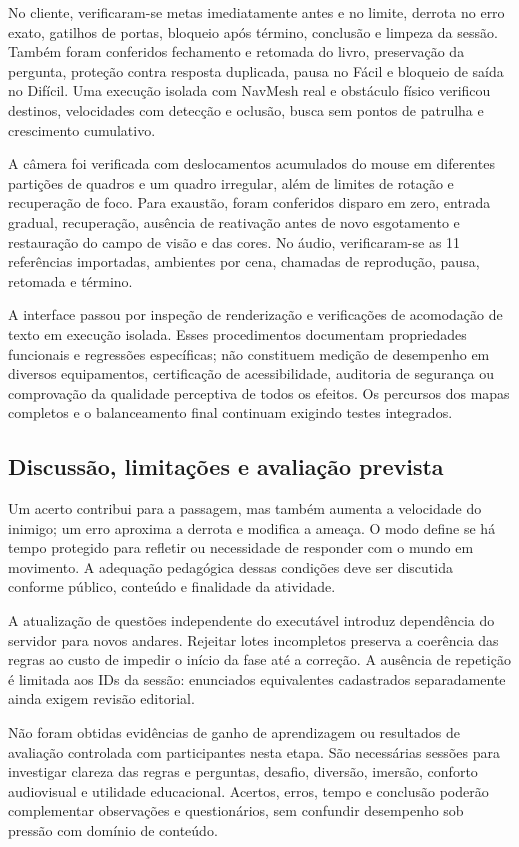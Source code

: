\documentclass[12pt]{article}
\begin{document}
No cliente, verificaram-se metas imediatamente antes e no limite, derrota no erro exato, gatilhos de portas, bloqueio após término, conclusão e limpeza da sessão. Também foram conferidos fechamento e retomada do livro, preservação da pergunta, proteção contra resposta duplicada, pausa no Fácil e bloqueio de saída no Difícil. Uma execução isolada com NavMesh real e obstáculo físico verificou destinos, velocidades com detecção e oclusão, busca sem pontos de patrulha e crescimento cumulativo.

A câmera foi verificada com deslocamentos acumulados do mouse em diferentes partições de quadros e um quadro irregular, além de limites de rotação e recuperação de foco. Para exaustão, foram conferidos disparo em zero, entrada gradual, recuperação, ausência de reativação antes de novo esgotamento e restauração do campo de visão e das cores. No áudio, verificaram-se as 11 referências importadas, ambientes por cena, chamadas de reprodução, pausa, retomada e término.

A interface passou por inspeção de renderização e verificações de acomodação de texto em execução isolada. Esses procedimentos documentam propriedades funcionais e regressões específicas; não constituem medição de desempenho em diversos equipamentos, certificação de acessibilidade, auditoria de segurança ou comprovação da qualidade perceptiva de todos os efeitos. Os percursos dos mapas completos e o balanceamento final continuam exigindo testes integrados.

\subsection{Discussão, limitações e avaliação prevista}

Um acerto contribui para a passagem, mas também aumenta a velocidade do inimigo; um erro aproxima a derrota e modifica a ameaça. O modo define se há tempo protegido para refletir ou necessidade de responder com o mundo em movimento. A adequação pedagógica dessas condições deve ser discutida conforme público, conteúdo e finalidade da atividade.

A atualização de questões independente do executável introduz dependência do servidor para novos andares. Rejeitar lotes incompletos preserva a coerência das regras ao custo de impedir o início da fase até a correção. A ausência de repetição é limitada aos IDs da sessão: enunciados equivalentes cadastrados separadamente ainda exigem revisão editorial.

Não foram obtidas evidências de ganho de aprendizagem ou resultados de avaliação controlada com participantes nesta etapa. São necessárias sessões para investigar clareza das regras e perguntas, desafio, diversão, imersão, conforto audiovisual e utilidade educacional. Acertos, erros, tempo e conclusão poderão complementar observações e questionários, sem confundir desempenho sob pressão com domínio de conteúdo.
\end{document}
